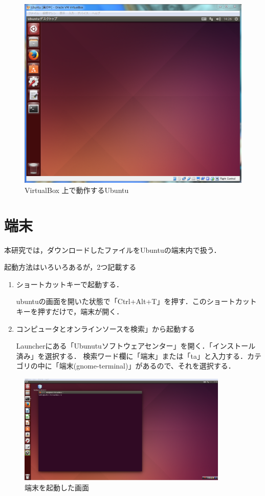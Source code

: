 \begin{figure}[H]
\centering
\includegraphics[width=14cm]{Ubuntu_on_VirtualBox.PNG}
\caption{VirtualBox 上で動作するUbuntu}\label{サンプル図}
\end{figure}


\section{端末}

本研究では，ダウンロードしたファイルをUbuntuの端末内で扱う．

起動方法はいろいろあるが，2つ記載する
\begin{enumerate}
 \item ショートカットキーで起動する．

ubuntuの画面を開いた状態で「Ctrl+Alt+T」を押す．このショートカットキーを押すだけで，端末が開く．

 \item コンピュータとオンラインソースを検索」から起動する

Launcherにある「Ubunutuソフトウェアセンター」を開く．「インストール済み」を選択する．
検索ワード欄に「端末」または「ta」と入力する．カテゴリの中に「端末(gnome-terminal)」があるので、それを選択する．

\end{enumerate}


\begin{figure}[H]
\centering
\includegraphics[width=10cm]{tan.png}
\caption{端末を起動した画面}\label{サンプル図}
\end{figure}




